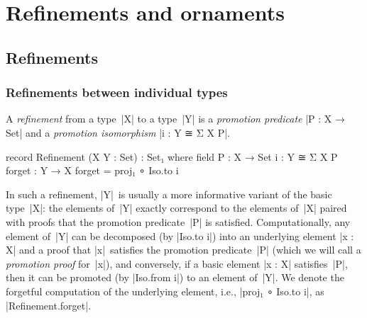 \chapter{Refinements and ornaments}
\label{chapter:ornaments}


\section{Refinements}

\subsection{Refinements between individual types}

A \emph{refinement} from a type~|X| to a type~|Y| is a \emph{promotion predicate} |P : X → Set| and a \emph{promotion isomorphism} |i : Y ≅ Σ X P|.
\begin{code}
record Refinement (X Y : Set) : Set₁ where
  field
    P  :  X → Set
    i  :  Y ≅ Σ X P
  forget : Y → X
  forget = proj₁ ∘ Iso.to i
\end{code}
In such a refinement, |Y|~is usually a more informative variant of the basic type~|X|: the elements of~|Y| exactly correspond to the elements of~|X| paired with proofs that the promotion predicate~|P| is satisfied.
Computationally, any element of~|Y| can be decomposed (by |Iso.to i|\kern1pt) into an underlying element |x : X| and a proof that |x|~satisfies the promotion predicate~|P| (which we will call a \emph{promotion proof} for~|x|), and conversely, if a basic element |x : X| satisfies~|P|, then it can be promoted (by |Iso.from i|\kern1pt) to an element of~|Y|.
We denote the forgetful computation of the underlying element, i.e., |proj₁ ∘ Iso.to i|, as |Refinement.forget|.


